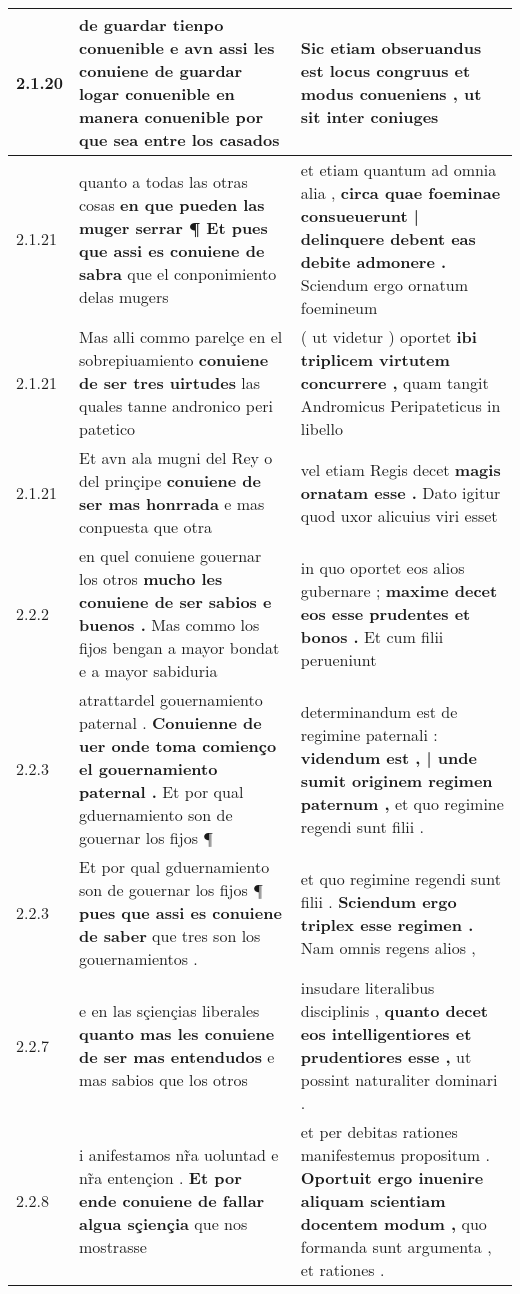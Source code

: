 \begin{tabular}{|p{1cm}|p{6.5cm}|p{6.5cm}|}
2.1.20 & de guardar tienpo conuenible \textbf{ e avn assi les conuiene de guardar logar conuenible en manera conuenible } por que sea entre los casados & Sic etiam obseruandus est locus congruus \textbf{ et modus conueniens , } ut sit inter coniuges \\\hline
2.1.21 & quanto a todas las otras cosas \textbf{ en que pueden las muger serrar ¶ Et pues que assi es conuiene de sabra } que el conponimiento delas mugers & et etiam quantum ad omnia alia , \textbf{ circa quae foeminae consueuerunt | delinquere debent eas debite admonere . } Sciendum ergo ornatum foemineum \\\hline
2.1.21 & Mas alli commo parelçe en el sobrepiuamiento \textbf{ conuiene de ser tres uirtudes } las quales tanne andronico peri patetico & ( ut videtur ) oportet \textbf{ ibi triplicem virtutem concurrere , } quam tangit Andromicus Peripateticus in libello \\\hline
2.1.21 & Et avn ala mugni del Rey o del prinçipe \textbf{ conuiene de ser mas honrrada } e mas conpuesta que otra & vel etiam Regis decet \textbf{ magis ornatam esse . } Dato igitur quod uxor alicuius viri esset \\\hline
2.2.2 & en quel conuiene gouernar los otros \textbf{ mucho les conuiene de ser sabios e buenos . } Mas commo los fijos bengan a mayor bondat e a mayor sabiduria & in quo oportet eos alios gubernare ; \textbf{ maxime decet eos esse prudentes et bonos . } Et cum filii perueniunt \\\hline
2.2.3 & atrattardel gouernamiento paternal . \textbf{ Conuienne de uer onde toma comienço el gouernamiento paternal . } Et por qual gduernamiento son de gouernar los fijos ¶ & determinandum est de regimine paternali : \textbf{ videndum est , | unde sumit originem regimen paternum , } et quo regimine regendi sunt filii . \\\hline
2.2.3 & Et por qual gduernamiento son de gouernar los fijos ¶ \textbf{ pues que assi es conuiene de saber } que tres son los gouernamientos . & et quo regimine regendi sunt filii . \textbf{ Sciendum ergo triplex esse regimen . } Nam omnis regens alios , \\\hline
2.2.7 & e en las sçiençias liberales \textbf{ quanto mas les conuiene de ser mas entendudos } e mas sabios que los otros & insudare literalibus disciplinis , \textbf{ quanto decet eos intelligentiores et prudentiores esse , } ut possint naturaliter dominari . \\\hline
2.2.8 & i anifestamos nr̃a uoluntad e nr̃a entençion . \textbf{ Et por ende conuiene de fallar algua sçiençia } que nos mostrasse & et per debitas rationes manifestemus propositum . \textbf{ Oportuit ergo inuenire aliquam scientiam docentem modum , } quo formanda sunt argumenta , et rationes . \\\hline

\end{tabular}
